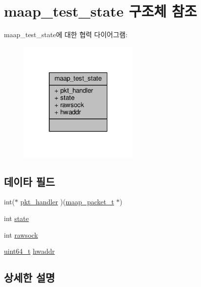 \hypertarget{structmaap__test__state}{}\section{maap\+\_\+test\+\_\+state 구조체 참조}
\label{structmaap__test__state}


maap\+\_\+test\+\_\+state에 대한 협력 다이어그램\+:
\nopagebreak
\begin{figure}[H]
\begin{center}
\leavevmode
\includegraphics[width=169pt]{structmaap__test__state__coll__graph}
\end{center}
\end{figure}
\subsection*{데이타 필드}
\begin{DoxyCompactItemize}
\item 
int($\ast$ \hyperlink{structmaap__test__state_a55dec58daecbc653704ad3f1030cd10a}{pkt\+\_\+handler} )(\hyperlink{maap__test_8c_a62402ba9e81ccd3dcbc7ac36fd4d7417}{maap\+\_\+packet\+\_\+t} $\ast$)
\item 
int \hyperlink{structmaap__test__state_a89f234133d3efe315836311cbf21c64b}{state}
\item 
int \hyperlink{structmaap__test__state_a9a1008a3b40e75b22aa5d7945cbf2918}{rawsock}
\item 
\hyperlink{parse_8c_aec6fcb673ff035718c238c8c9d544c47}{uint64\+\_\+t} \hyperlink{structmaap__test__state_ab94c768473f07d03807c003ca2898745}{hwaddr}
\end{DoxyCompactItemize}


\subsection{상세한 설명}


